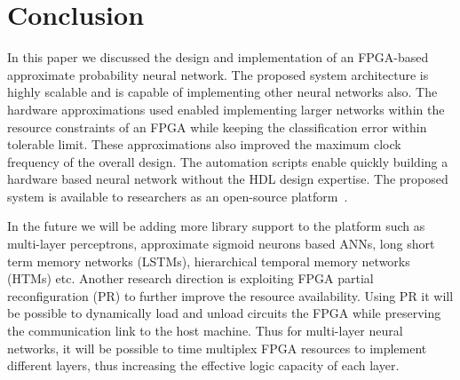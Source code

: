 \section{Conclusion}
\label{sec_conclusion}

In this paper we discussed the design and implementation of an FPGA-based approximate probability neural network.
The proposed system architecture is highly scalable and is capable of implementing other neural networks also.
The hardware approximations used enabled implementing larger networks within the resource constraints of an FPGA while keeping the classification error within tolerable limit.
These approximations also improved the maximum clock frequency of the overall design.
The automation scripts enable quickly building a hardware based neural network without the HDL design expertise.
The proposed system is available to researchers as an open-source platform~\cite{blanked}.

In the future we will be adding more library support to the platform such as multi-layer perceptrons, approximate sigmoid neurons based ANNs, long short term memory networks (LSTMs), hierarchical temporal memory networks (HTMs) etc.
Another research direction is exploiting FPGA partial reconfiguration (PR) to further improve the resource availability.
Using PR it will be possible to dynamically load and unload circuits the FPGA while preserving the communication link to the host machine.
Thus for multi-layer neural networks, it will be possible to time multiplex FPGA resources to implement different layers, thus increasing the effective logic capacity of each layer.

